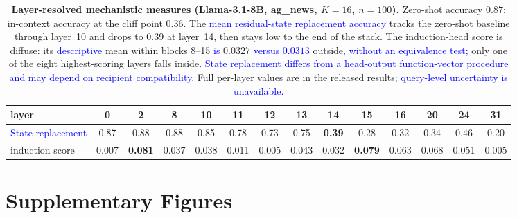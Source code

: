 \documentclass[11pt]{article}
\begin{document}
\begin{table}[h]
\centering
\caption{\textbf{Layer-resolved mechanistic measures (Llama-3.1-8B, ag\_news, $K{=}16$,
$n{=}100$).} Zero-shot accuracy $0.87$; in-context accuracy at the cliff point $0.36$.
The \textcolor{blue}{mean residual-state replacement accuracy} tracks the zero-shot baseline through layer~10 and drops to
$0.39$ at layer~14, then stays low to the end of the stack. The induction-head score is
diffuse: its \textcolor{blue}{descriptive} mean within blocks 8--15 \textcolor{blue}{is} $0.0327$ \textcolor{blue}{versus $0.0313$} outside\textcolor{blue}{,
without an equivalence test;} only one of the eight highest-scoring layers falls inside\textcolor{blue}{.
State replacement differs from a head-output function-vector procedure and may depend on
recipient compatibility}. Full per-layer values are in the released results\textcolor{blue}{; query-level uncertainty
is unavailable.}}
\label{stab:mech}
\scriptsize
\setlength{\tabcolsep}{3pt}
\begin{adjustbox}{max width=\textwidth}
\begin{tabular}{lccccccccccccc}
\toprule
layer & 0 & 2 & 8 & 10 & 11 & 12 & 13 & 14 & 15 & 16 & 20 & 24 & 31 \\
\midrule
\textcolor{blue}{State replacement} & 0.87 & 0.88 & 0.88 & 0.85 & 0.78 & 0.73 & 0.75 & \textbf{0.39} & 0.28 & 0.32 & 0.34 & 0.46 & 0.20 \\
induction score  & 0.007 & \textbf{0.081} & 0.037 & 0.038 & 0.011 & 0.005 & 0.043 & 0.032 & \textbf{0.079} & 0.063 & 0.068 & 0.051 & 0.005 \\
\bottomrule
\end{tabular}
\end{adjustbox}
\end{table}






\clearpage


\clearpage
\section*{Supplementary Figures}
\end{document}
